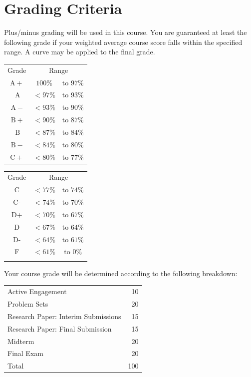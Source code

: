 \documentclass{syllabus}
\begin{document}
\newpage
\section*{Grading Criteria}

Plus/minus grading will be used in this course. You are guaranteed at least the following grade if your weighted average course score falls within the specified range. A curve may be applied to the final grade.

\begin{center}
\begin{minipage}[t]{0.75\textwidth}
\begin{tabular}{|ccc|}
\hline
Grade & \multicolumn{2}{c|}{Range} \\
$\mathrm{A}+$ & $100 \%$ & to $97 \%$ \\
$\mathrm{~A}$ & $<97 \%$ & to $93 \%$ \\
$\mathrm{~A}-$ & $<93 \%$ & to $90 \%$ \\
$\mathrm{~B}+$ & $<90 \%$ & to $87 \%$ \\
$\mathrm{~B}$ & $<87 \%$ & to $84 \%$ \\
$\mathrm{~B}-$ & $<84 \%$ & to $80 \%$ \\
$\mathrm{C}+$ & $<80 \%$ & to $77 \%$ \\
\hline
\end{tabular} \hspace{2cm}
\begin{tabular}{|ccc|}
\hline
Grade & \multicolumn{2}{c|}{Range} \\
C & $<77 \%$ & to $74 \%$ \\
C- & $<74 \%$ & to $70 \%$ \\
D+ & $<70 \%$ & to $67 \%$ \\
D & $<67 \%$ & to $64 \%$ \\
D- & $<64 \%$ & to $61 \%$ \\
F & $<61 \%$ & to $0 \%$ \\
 &  &  \\
\hline
\end{tabular}
\end{minipage}
\end{center} 

Your course grade will be determined according to the following breakdown:

\begin{center}
\begin{tabularx}{0.65\textwidth}{Xr}
\hline
Active Engagement & 10 \\
Problem Sets & 20 \\
Research Paper: Interim Submissions & 15 \\
Research Paper: Final Submission & 15 \\
Midterm & 20 \\
Final Exam & 20 \\
\hline
Total & 100 \\
\hline
\end{tabularx}
\end{center}
\end{document}
